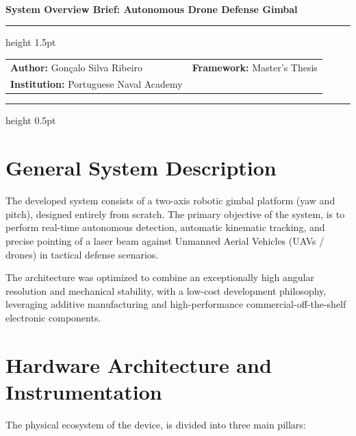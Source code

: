 \documentclass[11pt,a4paper]{article}
\begin{document}
\begin{center}
    \phantom{} \\
    \vspace{-1.5cm}
    \vspace{0.2cm}
    {\LARGE\bfseries\color{NavalBlue} System Overview Brief: Autonomous Drone Defense Gimbal} \\
    \vspace{0.3cm}
    {\color{SlateGray}\hrule height 1.5pt} 
    \vspace{0.3cm}
    \begin{tabular}{p{}r}
        \textbf{Author:} Gonçalo Silva Ribeiro & \textbf{Framework:} Master's Thesis \\
        \textbf{Institution:} Portuguese Naval Academy
    \end{tabular}
    \vspace{0.2cm}
    {\color{SlateGray}\hrule height 0.5pt} 
\end{center}

\vspace{0.5cm}

\section{General System Description}
The developed system consists of a two-axis robotic gimbal platform (yaw and pitch), designed entirely from scratch. The primary objective of the system, is to perform real-time autonomous detection, automatic kinematic tracking, and precise pointing of a laser beam against Unmanned Aerial Vehicles (UAVs / drones) in tactical defense scenarios.

The architecture was optimized to combine an exceptionally high angular resolution and mechanical stability, with a low-cost development philosophy, leveraging additive manufacturing and high-performance commercial-off-the-shelf electronic components.

\section{Hardware Architecture and Instrumentation}
The physical ecosystem of the device, is divided into three main pillars:
\end{document}
